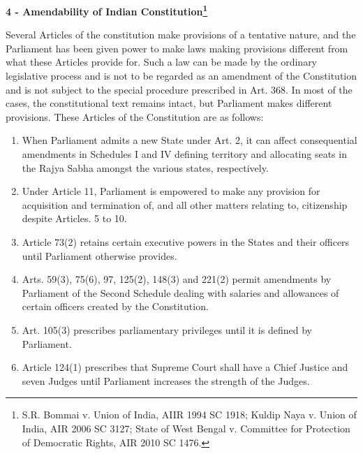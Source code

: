 \begin{multicols}{2}
\vspace{-.1cm}

\noi
{\large \bfseries 4 - Amendability of Indian Constitution\footnote{S.R. Bommai v. Union of India, AIIR 1994 SC 1918; Kuldip Naya v. Union of India, AIR 2006 SC 3127; State of West Bengal v. Committee for Protection of Democratic Rights, AIR 2010 SC 1476.}}

\vspace{-.2cm}

\noi
Several Articles of the constitution make provisions of a tentative nature, and the Parliament has
been given power to make laws making provisions different from what these Articles provide for.
Such a law can be made by the ordinary legislative process and is not to be regarded as an
amendment of the Constitution and is not subject to the special procedure prescribed in Art. 368.
In most of the cases, the constitutional text remains intact, but Parliament makes different
provisions. These Articles of the Constitution are as follows:

\vspace{-.3cm}

\begin{enumerate}
\itemsep=0pt


\item[(1)] When Parliament admits a new State under Art. 2, it can affect consequential amendments in
Schedules I and IV defining territory and allocating seats in the Rajya Sabha amongst the various
states, respectively.

\item[(2)] Under Article 11, Parliament is empowered to make any provision for acquisition and termination of, and all other matters relating to, citizenship despite Articles. 5 to 10.

\item[(3)] Article 73(2) retains certain executive powers in the States and their officers until Parliament
otherwise provides.

\item[(4)] Arts. 59(3), 75(6), 97, 125(2), 148(3) and 221(2) permit amendments by Parliament of the
Second Schedule dealing with salaries and allowances of certain officers created by the
Constitution.

\item[(5)] Art. 105(3) prescribes parliamentary privileges until it is defined by Parliament.

\item[(6)] Article 124(1) prescribes that Supreme Court shall have a Chief Justice and seven Judges until
Parliament increases the strength of the Judges.


\end{enumerate}
\end{multicols}

